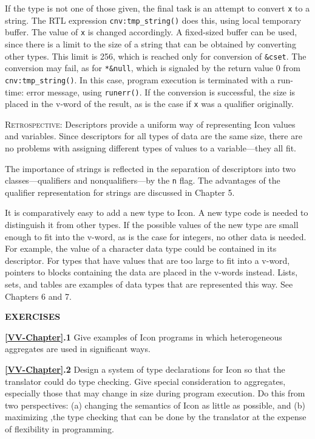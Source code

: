 If the type is not one of those given, the final task is an attempt to
convert \texttt{x} to a string. The RTL expression
\texttt{cnv:tmp\_string()} does this, using local temporary
buffer. The value of \texttt{x} is changed accordingly. A fixed-sized
buffer can be used, since there is a limit to the size of a string
that can be obtained by converting other types. This limit is 256,
which is reached only for conversion of \texttt{\&cset}. The
conversion may fail, as for \texttt{*\&null}, which is signaled by the
return value 0 from \texttt{cnv:tmp\_string()}. In this case, program
execution is terminated with a run-time: error message, using
\texttt{runerr()}. If the conversion is successful, the size is placed
in the v-word of the result, as is the case if \texttt{x} was a
qualifier originally.

\textsc{Retrospective}: Descriptors provide a uniform way of
representing Icon values and variables. Since descriptors for all
types of data are the same size, there are no problems with assigning
different types of values to a variable{---}they all fit.

The importance of strings is reflected in the separation of
descriptors into two classes{---}qualifiers and nonqualifiers{---}by the \texttt{n}
flag. The advantages of the qualifier representation for strings are
discussed in Chapter 5.

It is comparatively easy to add a new type to Icon. A new type code is
needed to distinguish it from other types. If the possible values of
the new type are small enough to fit into the v-word, as is the case
for integers, no other data is needed. For example, the value of a
character data type could be contained in its descriptor. For types
that have values that are too large to fit into a v-word, pointers to
blocks containing the data are placed in the v-words instead. Lists,
sets, and tables are examples of data types that are represented this
way. See Chapters 6 and 7.

\bigskip

\noindent\textbf{EXERCISES}

\noindent\textbf{\ref*{VV-Chapter}.1}
Give examples of Icon programs in which
heterogeneous aggregates are used in significant ways.

\noindent\textbf{\ref*{VV-Chapter}.2}
Design a system of type declarations for Icon so
that the translator could do type checking. Give special consideration
to aggregates, especially those that may change in size during program
execution. Do this from two perspectives: (a) changing the semantics
of Icon as little as possible, and (b) maximizing ,the type checking
that can be done by the translator at the expense of flexibility in
programming.

